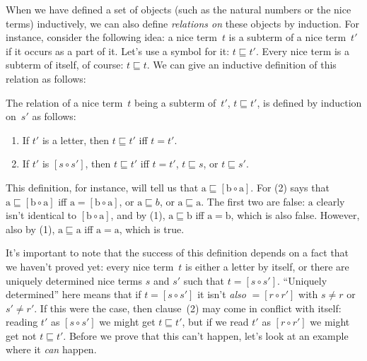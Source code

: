 \documentclass[../../../include/open-logic-section]{subfiles}
\begin{document}


When we have defined a set of objects (such as the natural numbers or
the nice terms) inductively, we can also define \emph{relations on}
these objects by induction.  For instance, consider the following
idea: a nice term~$t$ is a subterm of a nice term~$t'$ if it occurs as
a part of it.  Let's use a symbol for it: $t \sqsubseteq t'$. Every
nice term is a subterm of itself, of course: $t \sqsubseteq t$. We can
give an inductive definition of this relation as follows:

\begin{defn}
  The relation of a nice term~$t$ being a subterm of~$t'$, $t
  \sqsubseteq t'$, is defined by induction on~$s'$ as follows:
  \begin{enumerate}
  \item If $t'$ is a letter, then $t \sqsubseteq t'$ iff $t = t'$.
  \item If $t'$ is $[s \circ s']$, then $t \sqsubseteq t'$ iff $t =
    t'$, $t \sqsubseteq s$, or $t \sqsubseteq s'$.
  \end{enumerate}
\end{defn}

This definition, for instance, will tell us that $\mathrm{a}
\sqsubseteq [\mathrm{b} \circ \mathrm{a}]$. For (2) says that
$\mathrm{a} \sqsubseteq [\mathrm{b} \circ \mathrm{a}]$ iff $\mathrm{a}
= [\mathrm{b} \circ \mathrm{a}]$, or $\mathrm{a} \sqsubseteq b$, or
$\mathrm{a} \sqsubseteq \mathrm{a}$. The first two are false:
$\mathrm{a}$ clearly isn't identical to $[\mathrm{b} \circ
  \mathrm{a}]$, and by (1), $\mathrm{a} \sqsubseteq \mathrm{b}$ iff
$\mathrm{a} = \mathrm{b}$, which is also false. However, also by (1),
$\mathrm{a} \sqsubseteq \mathrm{a}$ iff $\mathrm{a} = \mathrm{a}$,
which is true.

It's important to note that the success of this definition depends on
a fact that we haven't proved yet: every nice term~$t$ is either a
letter by itself, or there are uniquely determined nice terms $s$ and
$s'$ such that $t = [s \circ s']$.  ``Uniquely determined'' here means
that if $t = [s \circ s']$ it isn't \emph{also} $= [r \circ r']$ with
$s \neq r$ or $s' \neq r'$. If this were the case, then clause~(2) may
come in conflict with itself: reading $t'$ as $[s \circ s']$ we might
get $t \sqsubseteq t'$, but if we read $t'$ as $[r \circ r']$ we might
get not $t \sqsubseteq t'$.  Before we prove that this can't happen,
let's look at an example where it \emph{can} happen.
\end{document}
